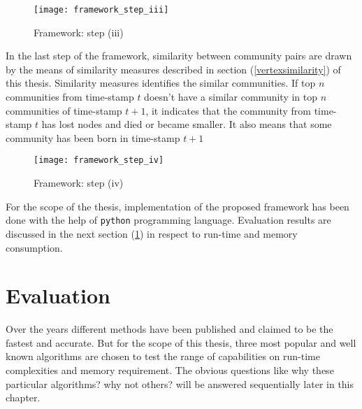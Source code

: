 \begin{figure}[H]
	\centering
	\texttt{[image: framework\_step\_iii]}
	\caption{Framework: step (iii)}
	\label{fig:community}
\end{figure}

In the last step of the framework, similarity between community pairs are drawn by the means of similarity measures described in section (\ref{vertexsimilarity}) of this thesis. Similarity measures identifies the similar communities. If top $n$ communities from time-stamp $t$ doesn't have a similar community in top $n$ communities of time-stamp $t+1$, it indicates that the community from time-stamp $t$ has lost nodes and died or became smaller. It also means that some community has been born in time-stamp $t+1$

\begin{figure}[H]
	\centering
	\texttt{[image: framework\_step\_iv]}
	\caption{Framework: step (iv)}
	\label{fig:community}
\end{figure}

For the scope of the thesis, implementation of the proposed framework has been done with the help of \texttt{python} programming language. Evaluation results are discussed in the next section (\ref{sec:evaluation}) in respect to run-time and memory consumption.

\section{Evaluation}\label{sec:evaluation}
Over the years different methods have been published and claimed to be the fastest and accurate. But for the scope of this thesis, three most popular and well known algorithms are chosen to test the range of capabilities on run-time complexities and memory requirement. The obvious questions like why these particular algorithms? why not others? will be answered sequentially later in this chapter.

